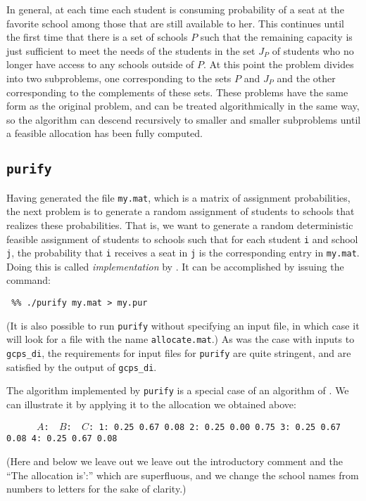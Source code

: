 \documentclass[12pt]{article}
\theoremstyle{definition}
\begin{document}
In general, at each time each student is consuming probability of a
seat at the favorite school among those that are still available to
her.  This continues until the first time that there is a set of
schools $P$ such that the remaining capacity is just sufficient to
meet the needs of the students in the set $J_P$ of students who no
longer have access to any schools outside of $P$.  At this point the
problem divides into two subproblems, one corresponding to the sets
$P$ and $J_P$ and the other corresponding to the complements of these
sets.  These problems have the same form as the original problem, and
can be treated algorithmically in the same way, so the algorithm can
descend recursively to smaller and smaller subproblems until a
feasible allocation has been fully computed.


\subsection{\texttt{purify}} \label{sec:Implementation}

Having generated the file \texttt{my.mat}, which is a matrix of
assignment probabilities, the next problem is to generate a random
assignment of students to schools that realizes these probabilities.
That is, we want to generate a random deterministic feasible
assignment of students to schools such that for each student
\texttt{i} and school \texttt{j}, the probability that \texttt{i}
receives a seat in \texttt{j} is the corresponding entry in
\texttt{my.mat}.  Doing this is called
\emph{implementation} by \cite{bckm13aer}. It can be accomplished by issuing the command:
\begin{obeylines}
  \texttt{
    \%\% ./purify my.mat > my.pur
    }
\end{obeylines}
\bigskip \noindent (It is also possible to run \texttt{purify} without
specifying an input file, in which case it will look for a file with
the name \texttt{allocate.mat}.)  As was the case with inputs to
\texttt{gcps\_di}, the requirements for input files for
\texttt{purify} are quite stringent, and are satisfied by the output
of \texttt{gcps\_di}.

The algorithm implemented by \texttt{purify} is a special case of an
algorithm of \cite{bckm13aer}.  We can illustrate it by applying it to
the allocation we obtained above:

\begin{obeylines}\texttt{
\ \ \ \ \ $A$:    \     $B$:  \      $C$:
1:      0.25     0.67     0.08
2:      0.25     0.00     0.75
3:      0.25     0.67     0.08
4:      0.25     0.67     0.08
}
\end{obeylines} \noindent
(Here and below we leave out we leave out the introductory comment and
the ``The allocation is':'' which are superfluous, and we change the
school names from numbers to letters for the sake of clarity.)
\end{document}

